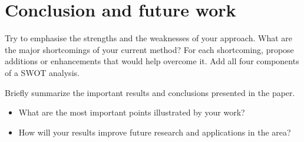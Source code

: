 \chapter{Conclusion and future work}
\label{chapter:concl}

Try to emphasise the strengths and the weaknesses of your approach.
What are the major shortcomings of your current method? For each shortcoming, propose additions or enhancements that would help overcome it. Add all four components of a SWOT analysis. 

Briefly summarize the important results and conclusions presented in the paper. 

\begin{itemize}
	\item What are the most important points illustrated by your work? 
	\item How will your results improve future research and applications in the area? 
\end{itemize}